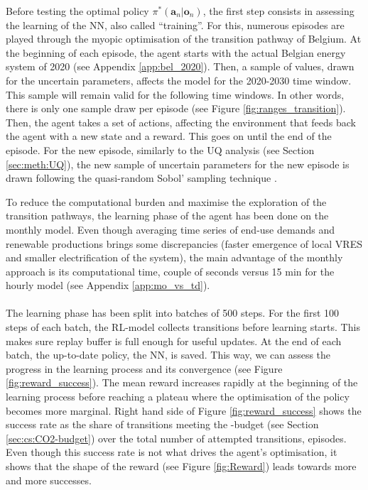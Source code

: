Before testing the optimal policy $\pi^*\left(\bm{a}_n | \bm{o}_n\right)$, the first step consists in assessing the learning of the \gls{NN}, also called ``training''. For this, numerous episodes are played through the myopic optimisation of the transition pathway of Belgium. At the beginning of each episode, the agent starts with the actual Belgian energy system of 2020 (see Appendix \ref{app:bel_2020}). Then, a sample of values, drawn for the uncertain parameters, affects the model for the 2020-2030 time window. This sample will remain valid for the following time windows. In other words, there is only one sample draw per episode (see Figure \ref{fig:ranges_transition}).  Then, the agent takes a set of actions, affecting the environment that feeds back the agent with a new state and a reward. This goes on until the end of the episode. For the new episode, similarly to the \gls{UQ} analysis (see Section \ref{sec:meth:UQ}), the new sample of uncertain parameters for the new episode is drawn following the quasi-random Sobol' sampling technique \cite{bratley2003implementing}.

To reduce the computational burden and maximise the exploration of the transition pathways, the learning phase of the agent has been done on the monthly model. Even though averaging time series of end-use demands and renewable productions brings some discrepancies (\ie faster emergence of local \gls{VRES} and smaller electrification of the system), the main advantage of the monthly approach is its computational time, \ie couple of seconds versus 15 min for the hourly model (see Appendix \ref{app:mo_vs_td}). \\

\\

The learning phase has been split into batches of 500 steps. For the first 100 steps of each batch, the \gls{RL}-model collects transitions before learning starts. This makes sure replay buffer is full enough for useful updates. At the end of each batch, the up-to-date policy, \ie the \gls{NN}, is saved. This way, we can assess the progress in the learning process and its convergence (see Figure \ref{fig:reward_success}).  The mean reward increases rapidly at the beginning of the learning process before reaching a plateau where the optimisation of the policy becomes more marginal. Right hand side of Figure \ref{fig:reward_success} shows the success rate as the share of transitions meeting the -budget (see Section \ref{sec:cs:CO2-budget}) over the total number of attempted transitions, \ie episodes. Even though this success rate is not what drives the agent's optimisation, it shows that the shape of the reward (see Figure \ref{fig:Reward}) leads towards more and more successes. 

